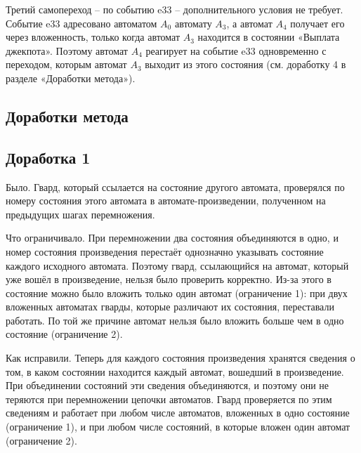 \documentclass[12pt]{article}
\begin{document}
Третий самопереход – по событию e33 – дополнительного условия не требует. Событие e33 адресовано автоматом $A_{0}$ автомату $A_{3}$, а автомат $A_{4}$ получает его через вложенность, только когда автомат $A_{3}$ находится в состоянии «Выплата джекпота». Поэтому автомат $A_{4}$ реагирует на событие e33 одновременно с переходом, которым автомат $A_{3}$ выходит из этого состояния (см. доработку 4 в разделе «Доработки метода»).





\subsection*{Доработки метода}

\subsection*{Доработка 1}

Было. Гвард, который ссылается на состояние другого автомата, проверялся по номеру состояния этого автомата в автомате-произведении, полученном на предыдущих шагах перемножения.

Что ограничивало. При перемножении два состояния объединяются в одно, и номер состояния произведения перестаёт однозначно указывать состояние каждого исходного автомата. Поэтому гвард, ссылающийся на автомат, который уже вошёл в произведение, нельзя было проверить корректно. Из-за этого в состояние можно было вложить только один автомат (ограничение 1): при двух вложенных автоматах гварды, которые различают их состояния, переставали работать. По той же причине автомат нельзя было вложить больше чем в одно состояние (ограничение 2).

Как исправили. Теперь для каждого состояния произведения хранятся сведения о том, в каком состоянии находится каждый автомат, вошедший в произведение. При объединении состояний эти сведения объединяются, и поэтому они не теряются при перемножении цепочки автоматов. Гвард проверяется по этим сведениям и работает при любом числе автоматов, вложенных в одно состояние (ограничение 1), и при любом числе состояний, в которые вложен один автомат (ограничение 2).
\end{document}
